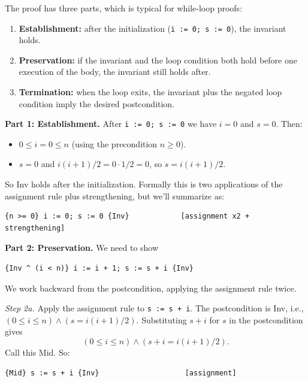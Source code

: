 \documentclass[11pt]{article}
\begin{document}
The proof has three parts, which is typical for while-loop proofs:
\begin{enumerate}
  \item \textbf{Establishment:} after the initialization (\texttt{i := 0; s := 0}), the invariant holds.
  \item \textbf{Preservation:} if the invariant and the loop condition both hold before one execution of the body, the invariant still holds after.
  \item \textbf{Termination:} when the loop exits, the invariant plus the negated loop condition imply the desired postcondition.
\end{enumerate}

\textbf{Part 1: Establishment.} After \texttt{i := 0; s := 0} we have $i = 0$ and $s = 0$. Then:
\begin{itemize}
  \item $0 \leq i = 0 \leq n$ (using the precondition $n \geq 0$). \checkmark
  \item $s = 0$ and $i(i+1)/2 = 0 \cdot 1 / 2 = 0$, so $s = i(i+1)/2$. \checkmark
\end{itemize}
So Inv holds after the initialization. Formally this is two applications of the assignment rule plus strengthening, but we'll summarize as:
\begin{lstlisting}
{n >= 0} i := 0; s := 0 {Inv}            [assignment x2 + strengthening]
\end{lstlisting}

\textbf{Part 2: Preservation.} We need to show
\begin{lstlisting}
{Inv ^ (i < n)} i := i + 1; s := s + i {Inv}
\end{lstlisting}
We work backward from the postcondition, applying the assignment rule twice.

\emph{Step 2a.} Apply the assignment rule to \texttt{s := s + i}. The postcondition is Inv, i.e., $(0 \leq i \leq n) \wedge (s = i(i+1)/2)$. Substituting $s + i$ for $s$ in the postcondition gives
\[
  (0 \leq i \leq n) \wedge (s + i = i(i+1)/2).
\]
Call this Mid. So:
\begin{lstlisting}
{Mid} s := s + i {Inv}                    [assignment]
\end{lstlisting}
\end{document}
